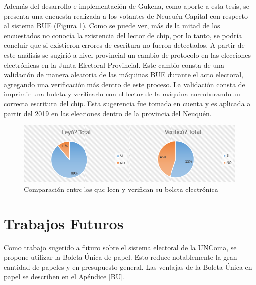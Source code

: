 Además del desarrollo e implementación de Gukena, como aporte a esta tesis, se presenta una encuesta realizada a los votantes de Neuquén Capital con respecto al sistema BUE (Figura \ref{graf:graficoEncuesta}). Como se puede ver, más de la mitad de los encuestados no conocía la existencia del lector de chip, por lo tanto, se podría concluir que si existieron errores de escritura no fueron detectados. A partir de este análisis se sugirió a nivel provincial un cambio de protocolo en las elecciones electrónicas en la Junta Electoral Provincial. Este cambio consta de una validación de manera aleatoria de las máquinas BUE durante el acto electoral, agregando una verificación más dentro de este proceso. La validación consta de imprimir una boleta y verificarlo con el lector de la máquina corroborando su correcta escritura del chip. Esta sugerencia fue tomada en cuenta y es aplicada a partir del 2019 en las elecciones dentro de la provincia del Neuquén.

\begin{figure}[h!]
  \includegraphics[width=\textwidth]{img/graficosEncuesta.png}
  \caption{Comparación entre los que leen y verifican su boleta electrónica}
  \label{graf:graficoEncuesta}
\end{figure}



\section{Trabajos Futuros}

Como trabajo sugerido a futuro  sobre el sistema electoral de la UNComa, se propone utilizar la Boleta Única de papel. Esto reduce notablemente la gran cantidad de papeles y en presupuesto general. Las ventajas de la Boleta Única en papel se describen en el Apéndice \ref{BU}.\newline
{}

